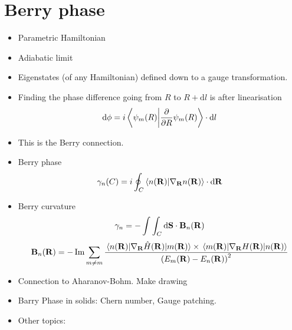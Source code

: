 \documentclass{article}
\renewcommand{\vec}[1]{\mathbf{#1}}
\begin{document}
\newpage
\section{Berry phase}
\begin{itemize}
    \item Parametric Hamiltonian
    \item Adiabatic limit
    \item Eigenstates (of any Hamiltonian) defined down to a gauge transformation.
    \item Finding the phase difference going from $R$ to $R+\mathrm{d}l$ is after linearisation
\begin{equation}
        \mathrm{d} \phi = i \braket{\psi_m(R)}{\pdv{R}\psi_m(R)} \cdot \mathrm{d}l
\end{equation}

\item This is the Berry connection.
\item Berry phase
\begin{equation}
    \gamma_n \qty(C) = i \oint_C \ip{n\qty(\vec{R})}{\nabla_{\vec{R}} n\qty(\vec{R})} \cdot \mathrm{d}\vec{R}
\end{equation}
\item Berry curvature
\begin{equation}
    \gamma_n = - \int \int_C \mathrm{d}\vec{S} \cdot \vec{B}_n\qty(\vec{R})
\end{equation}
\begin{equation}
    \vec{B}_n\qty(\vec{R}) = - \Im \sum_{m \neq m} \dfrac{\mel{n\qty(\vec{R})}{\nabla_{\vec{R}} \hat{H}\qty(\vec{R})}{m\qty(\vec{R})} \times \mel{m\qty(\vec{R})}{\nabla_{\vec{R}}H\qty(\vec{R})}{n\qty(\vec{R})}}{\qty(E_m\qty(\vec{R}) - E_n\qty(\vec{R}))^2}
\end{equation}
\item Connection to Aharanov-Bohm.
Make drawing
\item Barry Phase in solids: Chern number, Gauge patching.
\item Other topics: 
\end{itemize}
\end{document}
